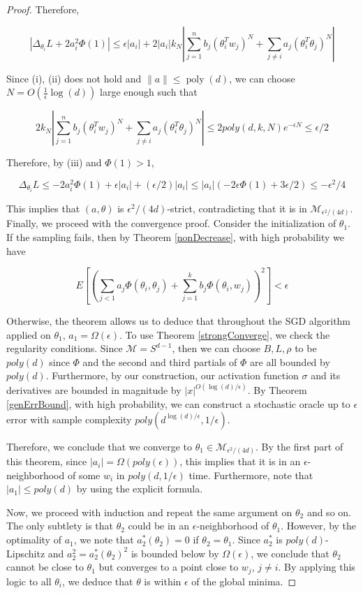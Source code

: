 \documentclass[11pt]{article}
\DeclareMathOperator{\poly}{poly}
\begin{document}
\begin{proof}
Therefore,

\[|\Delta_{\theta_i}L + 2a_i^2\Phi(1)| \leq \epsilon |a_i| +  2|a_i| k_N|\sum_{j=1}^n b_j (\theta_i^Tw_j)^N +  \sum_{j\neq i}  a_j(\theta_i^T\theta_j)^N|\]

Since (i), (ii) does not hold and $\|a\|\leq \poly(d)$, we can choose $N = O(\frac{1}{\epsilon}\log(d))$ large enough such that 

\[ 2k_N |\sum_{j=1}^n b_j (\theta_i^Tw_j)^N +  \sum_{j\neq i}  a_j(\theta_i^T\theta_j)^N| \leq  2poly(d,k,N)e^{-\epsilon N} \leq \epsilon/2\] 

Therefore, by (iii) and $\Phi(1) > 1$,

\[\Delta_{\theta_i} L \leq -2a_i^2 \Phi(1) +\epsilon |a_i|+(\epsilon/2)|a_i| \leq |a_i|(-2\epsilon \Phi(1) + 3\epsilon/2) \leq -\epsilon^2/4\]

This implies that $(a,\theta)$ is $\epsilon^2/(4d)$-strict, contradicting that it is in $\mathcal{M}_{\epsilon^2/(4d)}$. \\

Finally, we proceed with the convergence proof. Consider the initialization of $\theta_1$. If the sampling fails, then by Theorem \ref{nonDecrease}, with high probability we have

\[ E\left[\left( \sum_{j < 1} a_j \Phi(\theta_i,\theta_j) + \sum_{j=1}^k b_j \Phi(\theta_i,w_j)\right)^2\right] < \epsilon\]

Otherwise, the theorem allows us to deduce that throughout the SGD algorithm applied on $\theta_1$, $a_1 = \Omega(\epsilon)$. To use Theorem \ref{strongConverge}, we check the regularity conditions. Since $\mathcal{M} = S^{d-1}$, then we can choose $B, L, \rho$ to be $poly(d)$ since $\Phi$ and the second and third partials of $\Phi$ are all bounded by $poly(d)$. Furthermore, by our construction, our activation function $\sigma$ and its derivatives are bounded in magnitude by $|x|^{O(\log(d)/\epsilon)}$. By Theorem \ref{genErrBound}, with high probability, we can construct a stochastic oracle up to $\epsilon$ error with sample complexity $poly(d^{\log (d)/\epsilon},1/\epsilon)$.


Therefore, we conclude that we converge to $\theta_1 \in \mathcal{M}_{\epsilon^2/(4d)}$. By the first part of this theorem, since $|a_i| = \Omega(poly(\epsilon))$, this implies that it is in an $\epsilon$-neighborhood of some $w_{i}$ in $poly(d,1/\epsilon)$ time. Furthermore, note that $|a_1| \leq poly(d)$ by using the explicit formula.

Now, we proceed with induction and repeat the same argument on $\theta_2$ and so on. The only subtlety is that $\theta_2$ could be in an $\epsilon$-neighborhood of $\theta_1$. However, by the optimality of $a_1$, we note that $a_2^*(\theta_2) = 0$ if $\theta_2 =\theta_1$. Since $a_2^*$ is $poly(d)$-Lipschitz and $a_2^2 = a_2^*(\theta_2)^2$ is bounded below by $\Omega(\epsilon)$, we conclude that $\theta_2$ cannot be close to $\theta_1$ but converges to a point close to $w_{j}$, $j\neq i$. By applying this logic to all $\theta_i$, we deduce that $\theta$ is within $\epsilon$ of the global minima.

\end{proof}
\end{document}
